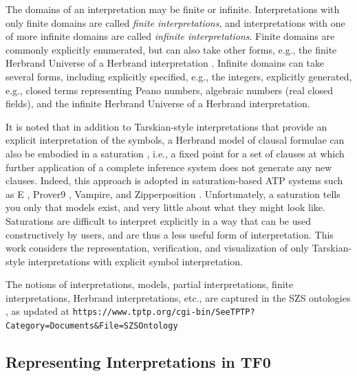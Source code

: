 \documentclass[letterpaper]{article}
\newcommand{\smalltt}[1]{\small \texttt{#1}}
\begin{document}
The domains of an interpretation may be finite or infinite.
Interpretations with only finite domains are called {\em finite interpretations}, and
interpretations with one of more infinite domains are called {\em infinite interpretations}.
Finite domains are commonly explicitly enumerated, but can also take other forms, e.g., the 
finite Herbrand Universe of a Herbrand interpretation \cite{Her30}.
Infinite domains can take several forms, including explicitly specified, e.g., the integers,
explicitly generated, e.g., closed terms representing Peano numbers, algebraic numbers (real
closed fields), and the infinite Herbrand Universe of a Herbrand interpretation.

It is noted that in addition to Tarskian-style interpretations that provide an explicit
interpretation of the symbols, a Herbrand model of clausal formulae can also be embodied in a 
saturation \cite{BG+01}, i.e., a fixed point for a set of clauses at which further application 
of a complete inference system does not generate any new clauses.
Indeed, this approach is adopted in saturation-based ATP systems such as E \cite{SCV19}, 
Prover9 \cite{McC-Prover9-URL}, Vampire, and Zipperposition \cite{VB+21}.
Unfortunately, a saturation tells you only that models exist, and very little about what they 
might look like. 
Saturations are difficult to interpret explicitly in a way that can be used constructively by 
users, and are thus a less useful form of interpretation.
This work considers the representation, verification, and visualization of only Tarskian-style 
interpretations with explicit symbol interpretation.

The notions of interpretations, models, partial interpretations, finite interpretations,
Herbrand interpretations, etc., are captured in the SZS ontologies \cite{Sut08-KEAPPA}, as
updated at \smalltt{https://www.tptp.org/cgi-bin/SeeTPTP? Category=Documents\&File=SZSOntology}

 
\subsection{Representing Interpretations in TF0}
\label{InterpretationsTF0}
\end{document}
